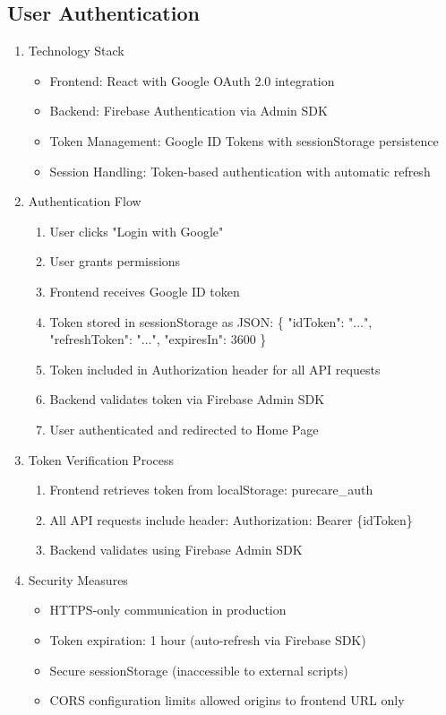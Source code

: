 \documentclass[conference]{IEEEtran}
\begin{document}
    \subsection{\textbf{User Authentication}}
        \begin{enumerate}
            \item Technology Stack
                \begin{itemize}
                    \item Frontend: React with Google OAuth 2.0 integration
                    \item Backend: Firebase Authentication via Admin SDK
                    \item Token Management: Google ID Tokens with sessionStorage persistence
                    \item Session Handling: Token-based authentication with automatic refresh
                \end{itemize}
            \item Authentication Flow
                \begin{enumerate}
                    \item User clicks "Login with Google"
                    \item User grants permissions
                    \item Frontend receives Google ID token
                    \item Token stored in sessionStorage as JSON: \{ "idToken": "...", "refreshToken": "...", "expiresIn": 3600 \}
                    \item Token included in Authorization header for all API requests
                    \item Backend validates token via Firebase Admin SDK
                    \item User authenticated and redirected to Home Page
                \end{enumerate}
            \item Token Verification Process
                \begin{enumerate}
                    \item Frontend retrieves token from localStorage: purecare\_auth
                    \item All API requests include header: Authorization: Bearer \{idToken\}
                    \item Backend validates using Firebase Admin SDK
                \end{enumerate}
            \item Security Measures
                \begin{itemize}
                    \item HTTPS-only communication in production
                    \item Token expiration: 1 hour (auto-refresh via Firebase SDK)
                    \item Secure sessionStorage (inaccessible to external scripts)
                    \item CORS configuration limits allowed origins to frontend URL only
                \end{itemize}
        \end{enumerate}
\end{document}
